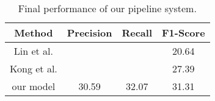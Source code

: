 \begin{table}[ht]
\centering
\begin{tabular}{|c|c|c|c|}
\hline

Method      &    Precision &     Recall &     F1-Score \\ \hline
Lin et al.  &              &            &     20.64    \\ \hline
Kong et al. &              &            &     27.39    \\ \hline
our model   &    30.59     &     32.07  &     31.31    \\ \hline


\end{tabular}
\caption{\label{t:final-results} Final performance of our pipeline system. }
\end{table}
